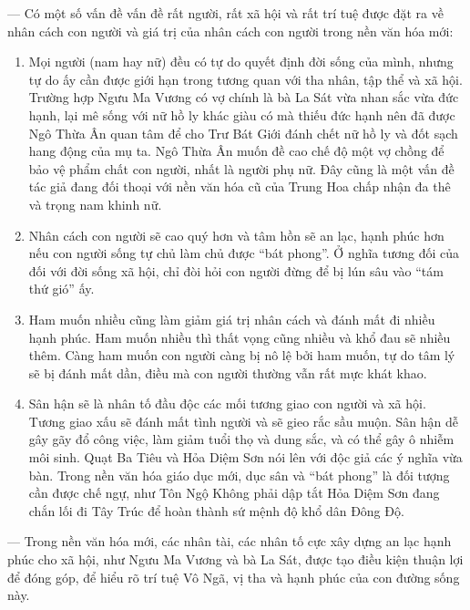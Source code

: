— Có một số vấn đề vấn đề rất người, rất xã hội và rất trí tuệ được đặt ra về nhân cách con người và giá trị của nhân cách con người trong nền văn hóa mới:

\begin{enumerate}[label=\itshape\alph*\upshape/]

    \item Mọi người (nam hay nữ) đều có tự do quyết định đời sống của mình, nhưng tự do ấy cần được giới hạn trong tương quan với tha nhân, tập thể và xã hội. Trường hợp Ngưu Ma Vương có vợ chính là bà La Sát vừa nhan sắc vừa đức hạnh, lại mê sống với nữ hồ ly khác giàu có mà thiếu đức hạnh nên đã được Ngô Thừa Ân quan tâm để cho Trư Bát Giới đánh chết nữ hồ ly và đốt sạch hang động của mụ ta. Ngô Thừa Ân muốn đề cao chế độ một vợ chồng để bảo vệ phẩm chất con người, nhất là người phụ nữ. Đây cũng là một vấn đề tác giả đang đối thoại với nền văn hóa cũ của Trung Hoa chấp nhận đa thê và trọng nam khinh nữ.

    \item Nhân cách con người sẽ cao quý hơn và tâm hồn sẽ an lạc, hạnh phúc hơn nếu con người sống tự chủ làm chủ được ``bát phong''. Ở nghĩa tương đối của đối với đời sống xã hội, chỉ đòi hỏi con người đừng để bị lún sâu vào ``tám thứ gió'' ấy.

    \item Ham muốn nhiều cũng làm giảm giá trị nhân cách và đánh mất đi nhiều hạnh phúc. Ham muốn nhiều thì thất vọng cũng nhiều và khổ đau sẽ nhiều thêm. Càng ham muốn con người càng bị nô lệ bởi ham muốn, tự do tâm lý sẽ bị đánh mất dần, điều mà con người thường vẫn rất mực khát khao.

    \item Sân hận sẽ là nhân tố đầu độc các mối tương giao con người và xã hội. Tương giao xấu sẽ đánh mất tình người và sẽ gieo rắc sầu muộn. Sân hận dễ gây gãy đổ công việc, làm giảm tuổi thọ và dung sắc, và có thể gây ô nhiễm môi sinh. Quạt Ba Tiêu và Hỏa Diệm Sơn nói lên với độc giả các ý nghĩa vừa bàn. Trong nền văn hóa giáo dục mới, dục sân và ``bát phong'' là đối tượng cần được chế ngự, như Tôn Ngộ Không phải dập tắt Hỏa Diệm Sơn đang chắn lối đi Tây Trúc để hoàn thành sứ mệnh độ khổ dân Đông Độ.
\end{enumerate}

— Trong nền văn hóa mới, các nhân tài, các nhân tố cực xây dựng an lạc hạnh phúc cho xã hội, như Ngưu Ma Vương và bà La Sát, được tạo điều kiện thuận lợi để đóng góp, để hiểu rõ trí tuệ Vô Ngã, vị tha và hạnh phúc của con đường sống này.

